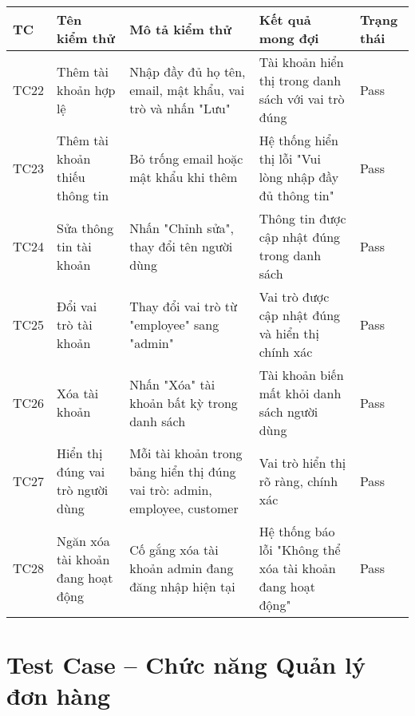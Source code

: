\begin{longtable}{|p{1cm}|p{3cm}|p{4cm}|p{3cm}|p{2cm}|}
\hline
\textbf{TC} & \textbf{Tên kiểm thử} & \textbf{Mô tả kiểm thử} & \textbf{Kết quả mong đợi} & \textbf{Trạng thái} \\
\hline
TC22 & Thêm tài khoản hợp lệ & Nhập đầy đủ họ tên, email, mật khẩu, vai trò và nhấn "Lưu" & Tài khoản hiển thị trong danh sách với vai trò đúng & Pass \\
\hline
TC23 & Thêm tài khoản thiếu thông tin & Bỏ trống email hoặc mật khẩu khi thêm & Hệ thống hiển thị lỗi "Vui lòng nhập đầy đủ thông tin" & Pass \\
\hline
TC24 & Sửa thông tin tài khoản & Nhấn "Chỉnh sửa", thay đổi tên người dùng & Thông tin được cập nhật đúng trong danh sách & Pass \\
\hline
TC25 & Đổi vai trò tài khoản & Thay đổi vai trò từ "employee" sang "admin" & Vai trò được cập nhật đúng và hiển thị chính xác & Pass \\
\hline
TC26 & Xóa tài khoản & Nhấn "Xóa" tài khoản bất kỳ trong danh sách & Tài khoản biến mất khỏi danh sách người dùng & Pass \\
\hline
TC27 & Hiển thị đúng vai trò người dùng & Mỗi tài khoản trong bảng hiển thị đúng vai trò: admin, employee, customer & Vai trò hiển thị rõ ràng, chính xác & Pass \\
\hline
TC28 & Ngăn xóa tài khoản đang hoạt động & Cố gắng xóa tài khoản admin đang đăng nhập hiện tại & Hệ thống báo lỗi "Không thể xóa tài khoản đang hoạt động" & Pass \\
\hline
\end{longtable}

\section*{Test Case – Chức năng Quản lý đơn hàng}

